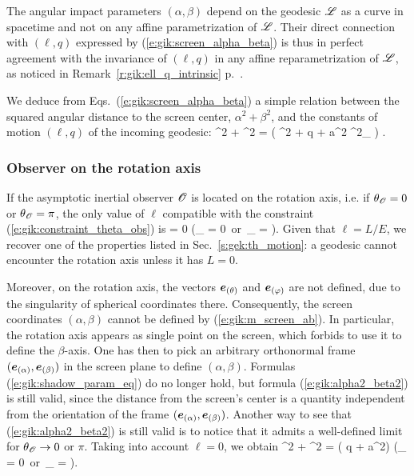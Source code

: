 \begin{remark}
The angular impact parameters $(\alpha, \beta)$ depend on the geodesic $\mathscr{L}$ as a curve
in spacetime and not on any affine parametrization of $\mathscr{L}$. Their direct
connection with $(\ell, q)$ expressed by (\ref{e:gik:screen_alpha_beta}) is thus in
perfect agreement with the invariance of $(\ell, q)$ in any affine reparametrization
of $\mathscr{L}$, as noticed in Remark~\ref{r:gik:ell_q_intrinsic} p.~\pageref{r:gik:ell_q_intrinsic}.
\end{remark}

We deduce from Eqs.~(\ref{e:gik:screen_alpha_beta}) a
simple relation between the squared angular distance to the screen center, $\alpha^2 + \beta^2$,
and the constants of motion $(\ell, q)$ of the incoming geodesic:
\be \label{e:gik:alpha2_beta2}
    \alpha^2 + \beta^2 =  \left(
    \ell^2 + q + a^2 \cos^2\th_{\Obs} \right) .
\ee

\subsubsection{Observer on the rotation axis}

If the asymptotic inertial observer $\mathscr{O}$ is located on the rotation axis,
i.e. if $\theta_{\mathscr{O}}=0$ or $\theta_{\mathscr{O}} = \pi$,
the only value of $\ell$ compatible with
the constraint (\ref{e:gik:constraint_theta_obs}) is
\be \label{e:gik:obs_axis_ell_zero}
     \ell = 0 \qquad (\th_{\Obs} = 0\ \mbox{or}\  \th_{\Obs} = \pi).
\ee
Given that $\ell = L/E$, we
recover one of the properties listed in Sec.~\ref{s:gek:th_motion}:
a geodesic cannot encounter the rotation axis unless it has $L = 0$.

Moreover, on the rotation axis,
the vectors $\bm{e}_{(\theta)}$
and $\bm{e}_{(\varphi)}$ are not defined, due to the singularity of spherical
coordinates there. Consequently, the screen coordinates $(\alpha,\beta)$
cannot be defined by (\ref{e:gik:m_screen_ab}). In particular, the rotation axis appears as
single point on the screen, which forbids to use it to define the $\beta$-axis.
One has then to pick an arbitrary orthonormal frame
$(\bm{e}_{(\alpha)}, \bm{e}_{(\beta)})$ in the screen plane to define
$(\alpha,\beta)$. Formulas (\ref{e:gik:shadow_param_eq}) do no longer
hold, but formula (\ref{e:gik:alpha2_beta2}) is still valid,
since the distance from the screen's center is a quantity independent from
the orientation of the frame $(\bm{e}_{(\alpha)}, \bm{e}_{(\beta)})$. Another
way to see that (\ref{e:gik:alpha2_beta2}) is still valid is to notice that
it admits a well-defined limit for $\theta_{\mathscr{O}}\to 0$ or $\pi$. Taking into
account $\ell=0$, we obtain
\be \label{e:gik:alpha2_beta2_axis}
    \alpha^2 + \beta^2 =  \left( q + a^2\right)
    \qquad (\th_{\Obs} = 0\ \mbox{or}\  \th_{\Obs} = \pi).
\ee


